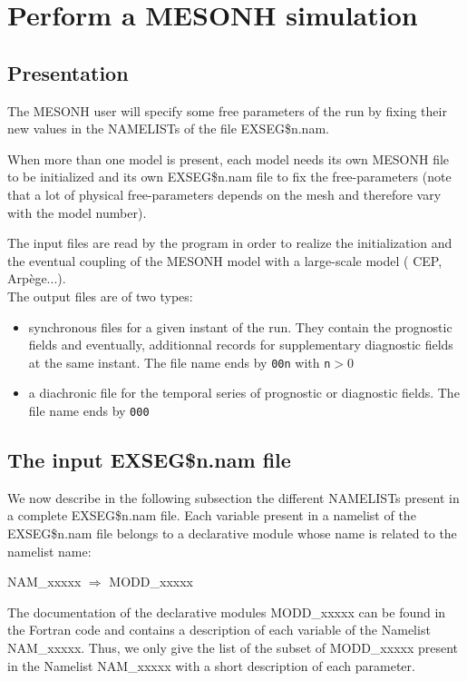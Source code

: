 \chapter{ Perform a MESONH simulation} \label{ch:model}


\section{Presentation}

The MESONH user will  
specify some free parameters of the run by fixing their new values in the
NAMELISTs of the file EXSEG\$n.nam. 

When more than one model is present, each model needs its own MESONH file to be
initialized and its own EXSEG\$n.nam file to fix the free-parameters (note that a lot
of physical free-parameters depends on the mesh and therefore vary with the
model number). 

The input files are read by the program in order to realize the initialization and
the eventual coupling of the
MESONH model with a large-scale model ( CEP, Arp\`ege...). \\

The output files are of two types:
\begin{itemize}
\item
synchronous files for a given instant of the run. They contain the prognostic
fields and  eventually,
additionnal records for supplementary diagnostic  fields at the same instant.
The file name ends by {\tt 00n} with {\tt n}$>$0
\item
a diachronic file for the temporal series of prognostic or diagnostic fields.
The file name ends by {\tt 000}
\end{itemize}

\section{The input EXSEG\$n.nam file}
We now describe in the following subsection the different NAMELISTs present in 
a complete EXSEG\$n.nam file. 
Each variable present in a namelist of the EXSEG\$n.nam file
belongs to a declarative module whose name is related to the namelist name:

NAM\_xxxxx    $\Longrightarrow $ MODD\_xxxxx

The documentation of the
declarative modules  MODD\_xxxxx can be found in the Fortran code and contains 
a description of each variable of the Namelist NAM\_xxxxx. Thus, we 
only give the list of the subset of MODD\_xxxxx present in the Namelist  
NAM\_xxxxx with a short description of each parameter.


